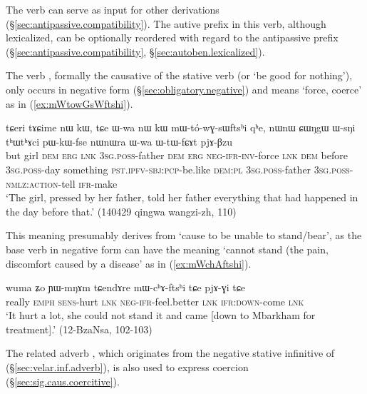 The verb  can serve as input for other derivations (§\ref{sec:antipassive.compatibility}). The autive prefix  in this verb, although lexicalized, can be optionally reordered with regard to the antipassive prefix (§\ref{sec:antipassive.compatibility}, §\ref{sec:autoben.lexicalized}).

The verb , formally the causative of the stative verb  (or `be good for nothing'), only occurs in negative form (§\ref{sec:obligatory.negative}) and means `force, coerce' as in (\ref{ex:mWtowGsWftshi}).

\begin{exe}
\ex \label{ex:mWtowGsWftshi}
 \gll   tɕeri tɤɕime nɯ kɯ, tɕe ɯ-wa nɯ kɯ mɯ-tó-wɣ-sɯftsʰi qʰe, nɯnɯ ɕɯŋgɯ ɯ-sŋi tʰɯtʰɤci pɯ-kɯ-fse nɯnɯra ɯ-wa ɯ-tɯ-fɕɤt pjɤ-βzu \\
 but girl \textsc{dem} \textsc{erg} \textsc{lnk} \textsc{3sg}.\textsc{poss}-father \textsc{dem} \textsc{erg} \textsc{neg}-\textsc{ifr}-\textsc{inv}-force \textsc{lnk} \textsc{dem} before \textsc{3sg}.\textsc{poss}-day something \textsc{pst}.\textsc{ipfv}-\textsc{sbj}:\textsc{pcp}-be.like \textsc{dem}:\textsc{pl} \textsc{3sg}.\textsc{poss}-father \textsc{3sg}.\textsc{poss}-\textsc{nmlz}:\textsc{action}-tell \textsc{ifr}-make \\
\glt `The girl, pressed by her father, told her father everything that had happened in the day before that.' (140429 qingwa wangzi-zh, 110)
\end{exe}

This meaning presumably derives from `cause to be unable to stand/bear', as the base verb  in negative form can have the meaning `cannot stand (the pain, discomfort caused by a disease' as in (\ref{ex:mWchAftshi}).

\begin{exe}
\ex \label{ex:mWchAftshi}
 \gll wuma ʑo ɲɯ-mŋɤm tɕendɤre mɯ-cʰɤ-ftsʰi tɕe pjɤ-ɣi tɕe \\
 really \textsc{emph} \textsc{sens}-hurt \textsc{lnk} \textsc{neg}-\textsc{ifr}-feel.better \textsc{lnk} \textsc{ifr}:\textsc{down}-come \textsc{lnk} \\
\glt `It hurt a lot, she could not stand it and came [down to Mbarkham for treatment].' (12-BzaNsa, 102-103)
\end{exe}

The related adverb , which originates from the negative stative infinitive of  (§\ref{sec:velar.inf.adverb}), is also used to express coercion (§\ref{sec:sig.caus.coercitive}).

